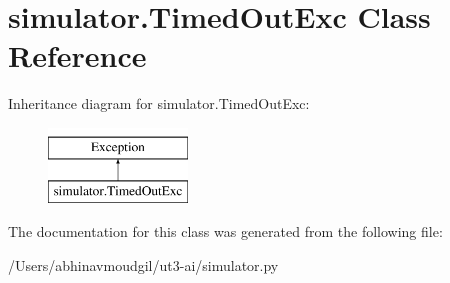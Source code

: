 \hypertarget{classsimulator_1_1_timed_out_exc}{}\section{simulator.\+Timed\+Out\+Exc Class Reference}
\label{classsimulator_1_1_timed_out_exc}
Inheritance diagram for simulator.\+Timed\+Out\+Exc\+:\begin{figure}[H]
\begin{center}
\leavevmode
\includegraphics[height=2.000000cm]{classsimulator_1_1_timed_out_exc}
\end{center}
\end{figure}


The documentation for this class was generated from the following file\+:\begin{DoxyCompactItemize}
\item 
/\+Users/abhinavmoudgil/ut3-\/ai/simulator.\+py\end{DoxyCompactItemize}

